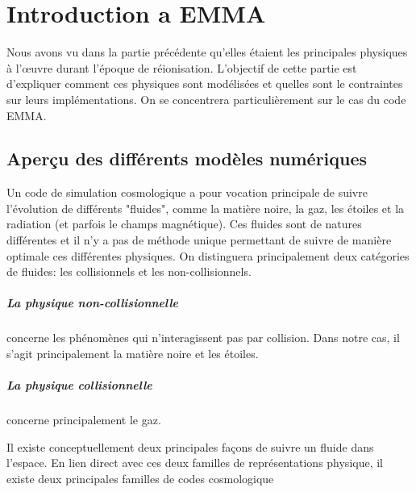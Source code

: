 \chapter{Introduction a EMMA}
\label{ch:introduction}


Nous avons vu dans la partie précédente qu'elles étaient les principales physiques à l’œuvre durant l'époque de réionisation.
L'objectif de cette partie est d'expliquer comment ces physiques sont modélisées et quelles sont le contraintes sur leurs implémentations.
On se concentrera particulièrement sur le cas du code EMMA.



\section{Aperçu des différents modèles numériques}

Un code de simulation cosmologique a pour vocation principale de suivre l'évolution de différents "fluides", comme la matière noire, la gaz, les étoiles et la radiation (et parfois le champs magnétique).
Ces fluides sont de natures différentes et il n'y a pas de méthode unique permettant de suivre de manière optimale ces différentes physiques.
On distinguera principalement deux catégories de fluides: les collisionnels et les non-collisionnels.

\paragraph{La physique non-collisionnelle} concerne les phénomènes qui n'interagissent pas par collision.
Dans notre cas, il s'agit principalement la matière noire et les étoiles. 

\paragraph{La physique collisionnelle} concerne principalement le gaz.

Il existe conceptuellement deux principales façons de suivre un fluide dans l'espace.
En lien direct avec ces deux familles de représentations physique, il existe deux principales familles de codes cosmologique%

